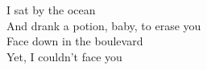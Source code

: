 I sat by the ocean \\
And drank a potion, baby, to erase you \\
Face down in the boulevard \\
Yet, I couldn't face you 

